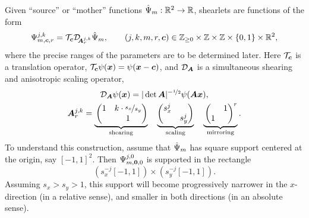 Given ``source'' or ``mother'' functions $\hat{\Psi}_m:\mathbb{R}^2\to\mathbb{R}$, shearlets are functions of the form
\[
    \aPsi{m}{\Bc}{r}{j}{k} = \cT_\Bc \cD_{\hspace{-0.1cm}\BA_r^{j,k}} \hPsi_m, \qquad
    (j,k,m,r,\Bc) \in \bbZ_{\geq0} \times \bbZ \times \bbZ \times \{0,1\} \times \bbR^2,
\]
where the precise ranges of the parameters are to be determined later. Here $\mathcal{T}_{\bm c}$ is a translation
operator, $\mathcal{T}_{\bm c}\psi({\bm x}) = \psi({\bm x}-{\bm c})$, and $\mathcal{D}_{{\bm A}}$ is a simultaneous shearing and anisotropic
scaling operator,
\begin{gather} \label{eqn:trflet}
    \nonumber \cD_{\BA}\psi(\Bx) = |\det\BA|^{-\nicefrac{1}{2}} \psi(\BA\Bx), \\
    \BA_r^{j,k} = 
        \underbrace{
            \vphantom{\begin{pmatrix} s_x^j& \\ &s_y^j \end{pmatrix}}
            \begin{pmatrix} 1 & k\cdot \nicefrac{s_x}{s_y} \\ &1 \end{pmatrix}}_{\text{shearing}} \quad
        \underbrace{\begin{pmatrix} s_x^j& \\ &s_y^j \end{pmatrix}}_{\text{scaling}} \quad
        \underbrace{
            \vphantom{\begin{pmatrix} s_x^j& \\ &s_y^j \end{pmatrix}}
            \begin{pmatrix} &1 \\ 1& \end{pmatrix}^r}_{\text{mirroring}}.
\end{gather}
To understand this construction, assume that $\hat{\Psi}_m$ has square support centered at the origin, say
$[-1,1]^2$. Then $\Psi_{m,{\bm0},0}^{j,0}$ is supported in the rectangle
\[
    \left( s_x^{-j}[-1,1] \right) \times \left( s_y^{-j}[-1,1] \right).
\]
Assuming $s_x>s_y>1$, this support will become progressively narrower in the $x$-direction (in a relative
sense), and smaller in both directions (in an absolute sense).

